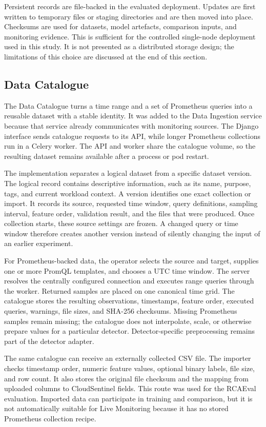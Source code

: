 Persistent records are file-backed in the evaluated deployment. Updates are first written to temporary files or staging directories and are then moved into place. Checksums are used for datasets, model artefacts, comparison inputs, and monitoring evidence. This is sufficient for the controlled single-node deployment used in this study. It is not presented as a distributed storage design; the limitations of this choice are discussed at the end of this section.

\subsection{Data Catalogue}

The Data Catalogue turns a time range and a set of Prometheus queries into a reusable dataset with a stable identity. It was added to the Data Ingestion service because that service already communicates with monitoring sources. The Django interface sends catalogue requests to its API, while longer Prometheus collections run in a Celery worker. The API and worker share the catalogue volume, so the resulting dataset remains available after a process or pod restart.

The implementation separates a logical dataset from a specific dataset version. The logical record contains descriptive information, such as its name, purpose, tags, and current workload context. A version identifies one exact collection or import. It records its source, requested time window, query definitions, sampling interval, feature order, validation result, and the files that were produced. Once collection starts, these source settings are frozen. A changed query or time window therefore creates another version instead of silently changing the input of an earlier experiment.

For Prometheus-backed data, the operator selects the source and target, supplies one or more PromQL templates, and chooses a UTC time window. The server resolves the centrally configured connection and executes range queries through the worker. Returned samples are placed on one canonical time grid. The catalogue stores the resulting observations, timestamps, feature order, executed queries, warnings, file sizes, and SHA-256 checksums. Missing Prometheus samples remain missing; the catalogue does not interpolate, scale, or otherwise prepare values for a particular detector. Detector-specific preprocessing remains part of the detector adapter.

The same catalogue can receive an externally collected CSV file. The importer checks timestamp order, numeric feature values, optional binary labels, file size, and row count. It also stores the original file checksum and the mapping from uploaded columns to CloudSentinel fields. This route was used for the RCAEval evaluation. Imported data can participate in training and comparison, but it is not automatically suitable for Live Monitoring because it has no stored Prometheus collection recipe.

